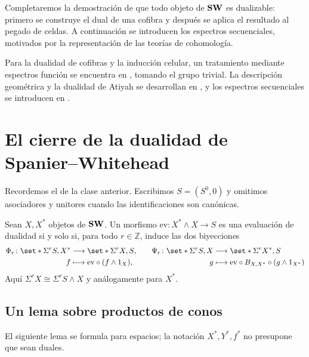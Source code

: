 Completaremos la demostración de que todo objeto de $\mathbf{SW}$ es dualizable: primero se construye el dual de una cofibra y después se aplica el resultado al pegado de celdas. A continuación se introducen los espectros secuenciales, motivados por la representación de las teorías de cohomología.

Para la dualidad de cofibras y la inducción celular, un tratamiento mediante espectros función se encuentra en \cite[cap.~III, lema~2.5 y teorema~2.7]{lewis1986}, tomando el grupo trivial. La descripción geométrica y la dualidad de Atiyah se desarrollan en \cite[\S3, especialmente teorema~3.3]{atiyah1961}, y los espectros secuenciales se introducen en \cite[\S2.1]{malkiewich}.

\section{El cierre de la dualidad de Spanier--Whitehead}

Recordemos el  de la clase anterior. Escribimos $S=(S^0,0)$ y omitimos asociadores y unitores cuando las identificaciones son canónicas.

Sean $X,X^*$ objetos de $\mathbf{SW}$. Un morfismo $\mathrm{ev}\colon X^*\wedge X\to S$ es una evaluación de dualidad si y solo si, para todo $r\in\mathbb Z$, induce las dos biyecciones
\[
\begin{aligned}
\Phi_r\colon\set*{\Sigma^rS,X^*}&\longrightarrow\set*{\Sigma^rX,S}, &&&\Psi_r\colon\set*{\Sigma^rS,X}&\longrightarrow\set*{\Sigma^rX^*,S}\\
f&\longmapsto\mathrm{ev}\circ(f\wedge1_X), &&&g&\longmapsto\mathrm{ev}\circ B_{X,X^*}\circ(g\wedge1_{X^*})
\end{aligned}
\]
Aquí $\Sigma^rX\cong\Sigma^rS\wedge X$ y análogamente para $X^*$.

\subsection{Un lema sobre productos de conos}

El siguiente lema se formula para espacios; la notación $X^*,Y^*,f^*$ no presupone que sean duales.

